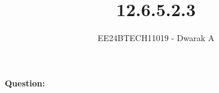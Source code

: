 \documentclass[journal]{IEEEtran}
\begin{document}

\vspace{3cm}

\title{12.6.5.2.3}
\author{EE24BTECH11019 - Dwarak A}
{\let\newpage\relax\maketitle}

\renewcommand{\thefigure}{\theenumi}
\renewcommand{\thetable}{\theenumi}
\setlength{\intextsep}{10pt} %


\renewcommand{\thetable}{\theenumi}

\textbf{Question:}
\end{document}

